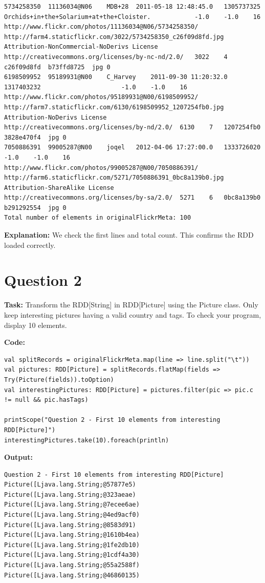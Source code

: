 \documentclass[11pt]{article}
\begin{document}
\begin{lstlisting}
5734258350	11136034@N06	MDB+28	2011-05-18 12:48:45.0	1305737325			Orchids+in+the+Solarium+at+the+Cloister.			-1.0	-1.0	16	http://www.flickr.com/photos/11136034@N06/5734258350/	http://farm4.staticflickr.com/3022/5734258350_c26f09d8fd.jpg	Attribution-NonCommercial-NoDerivs License	http://creativecommons.org/licenses/by-nc-nd/2.0/	3022	4	c26f09d8fd	b73ffd8725	jpg	0
6198509952	95189931@N00	C_Harvey	2011-09-30 11:20:32.0	1317403232						-1.0	-1.0	16	http://www.flickr.com/photos/95189931@N00/6198509952/	http://farm7.staticflickr.com/6130/6198509952_1207254fb0.jpg	Attribution-NoDerivs License	http://creativecommons.org/licenses/by-nd/2.0/	6130	7	1207254fb0	3828e470f4	jpg	0
7050886391	99005287@N00	joqel	2012-04-06 17:27:00.0	1333726020						-1.0	-1.0	16	http://www.flickr.com/photos/99005287@N00/7050886391/	http://farm6.staticflickr.com/5271/7050886391_0bc8a139b0.jpg	Attribution-ShareAlike License	http://creativecommons.org/licenses/by-sa/2.0/	5271	6	0bc8a139b0	b291292554	jpg	0
Total number of elements in originalFlickrMeta: 100
\end{lstlisting}

\textbf{Explanation:} We check the first lines and total count. This confirms the RDD loaded correctly.

\section*{Question 2}
\textbf{Task:} Transform the RDD[String] in RDD[Picture] using the Picture class. Only keep interesting pictures having a valid country and tags. To check your program, display 10 elements.

\textbf{Code:}
\begin{lstlisting}
val splitRecords = originalFlickrMeta.map(line => line.split("\t"))
val pictures: RDD[Picture] = splitRecords.flatMap(fields => Try(Picture(fields)).toOption)
val interestingPictures: RDD[Picture] = pictures.filter(pic => pic.c != null && pic.hasTags)

printScope("Question 2 - First 10 elements from interesting RDD[Picture]")
interestingPictures.take(10).foreach(println)
\end{lstlisting}

\textbf{Output:}
\begin{lstlisting}
Question 2 - First 10 elements from interesting RDD[Picture]
Picture([Ljava.lang.String;@57877e5)
Picture([Ljava.lang.String;@323aeae)
Picture([Ljava.lang.String;@7ecee6ae)
Picture([Ljava.lang.String;@4ed9acf0)
Picture([Ljava.lang.String;@8583d91)
Picture([Ljava.lang.String;@1610b4ea)
Picture([Ljava.lang.String;@1fe2db10)
Picture([Ljava.lang.String;@1cdf4a30)
Picture([Ljava.lang.String;@55a2588f)
Picture([Ljava.lang.String;@46860135)
\end{lstlisting}
\end{document}

